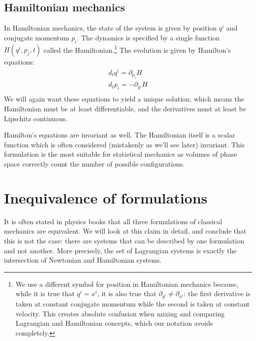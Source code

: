 \subsection{Hamiltonian mechanics}

In Hamiltonian mechanics, the state of the system is given by position $q^i$ and conjugate momentum $p_i$. The dynamics is specified by a single function $H(q^i, p_j, t)$ called the Hamiltonian.\footnote{We use a different symbol for position in Hamiltonian mechanics because, while it is true that $q^i = x^i$, it is also true that $\partial_{q^i} \neq \partial_{x^i}$: the first derivative is taken at constant conjugate momentum while the second is taken at constant velocity. This creates absolute confusion when mixing and comparing Lagrangian and Hamiltonian concepts, which our notation avoids completely.} The evolution is given by Hamilton's equations:
\begin{equation}\label{rp-cm-HamiltonEq}
	\begin{aligned}
		d_t q^i = \partial_{p_i} H \\
		d_t p_i = - \partial_{q^i} H \\
	\end{aligned}
\end{equation}
We will again want these equations to yield a unique solution, which means the Hamiltonian must be at least differentiable, and the derivatives must at least be Lipschitz continuous.

Hamilton's equations are invariant as well. The Hamiltonian itself is a scalar function which is often considered (mistakenly as we'll see later) invariant. This formulation is the most suitable for statistical mechanics as volumes of phase space correctly count the number of possible configurations.

\section{Inequivalence of formulations}\label{rp-cm-inequivalenceOfFormulations}

It is often stated in physics books that all three formulations of classical mechanics are equivalent. We will look at this claim in detail, and conclude that this is not the case: there are systems that can be described by one formulation and not another. More precisely, the set of Lagrangian systems is exactly the intersection of Newtonian and Hamiltonian systems.

